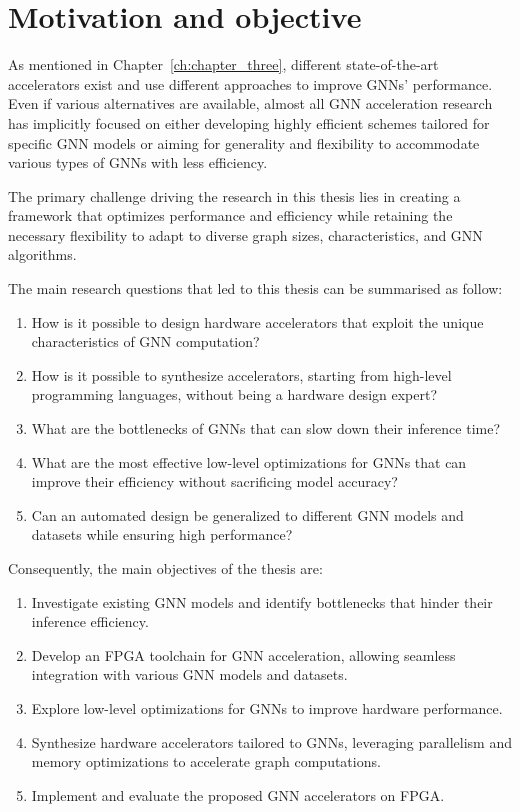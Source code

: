 \section{Motivation and objective}
\label{sec:motivation}%

As mentioned in Chapter~\ref{ch:chapter_three}, different state-of-the-art accelerators exist and use different approaches to improve GNNs' performance.
Even if various alternatives are available, almost all GNN acceleration research has implicitly focused on either developing highly efficient schemes tailored for specific GNN models or aiming for generality and flexibility to accommodate various types of GNNs with less efficiency.

The primary challenge driving the research in this thesis lies in creating a framework that optimizes performance and efficiency while retaining the necessary flexibility to adapt to diverse graph sizes, characteristics, and GNN algorithms.

The main research questions that led to this thesis can be summarised as follow:
\begin{enumerate}
    \item How is it possible to design hardware accelerators that exploit the unique characteristics of GNN computation?
    \item How is it possible to synthesize accelerators, starting from high-level programming languages, without being a hardware design expert?
    \item What are the bottlenecks of GNNs that can slow down their inference time?
    \item What are the most effective low-level optimizations for GNNs that can improve their efficiency without sacrificing model accuracy?
    \item Can an automated design be generalized to different GNN models and datasets while ensuring high performance?
\end{enumerate}


Consequently, the main objectives of the thesis are:
\begin{enumerate}
    \item Investigate existing GNN models and identify bottlenecks that hinder their inference efficiency.
    \item Develop an FPGA toolchain for GNN acceleration, allowing seamless integration with various GNN models and datasets.
    \item Explore low-level optimizations for GNNs to improve hardware performance.
    \item Synthesize hardware accelerators tailored to GNNs, leveraging parallelism and memory optimizations to accelerate graph computations.
    \item Implement and evaluate the proposed GNN accelerators on FPGA\@.
\end{enumerate}


